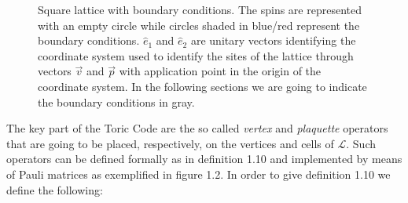 \documentclass{Configuration_Files/PoliMi3i_thesis}
\begin{document}
\begin{figure}
\begin{center}
	\end{center}
	
	\caption{Square lattice with boundary conditions. The spins are represented with an empty circle while circles shaded in blue/red represent the boundary conditions. $\hat{e}_1$ and $\hat{e}_2$ are unitary vectors identifying the coordinate system used to identify the sites of the lattice through vectors $\vec{v}$ and $\vec{p}$ with application point in the origin of the coordinate system.
	In the following sections we are going to indicate the boundary conditions in gray.}
	\label{fig:lattice}
\end{figure}

\newpage
The key part of the Toric Code are the so called \textit{vertex} and \textit{plaquette} operators that are going to be placed, respectively, on the vertices and cells of $\mathcal{L}$. Such operators can be defined formally as in definition 1.10 and implemented by means of Pauli matrices as exemplified in figure 1.2. In order to give definition 1.10 we define the following:
\end{document}
